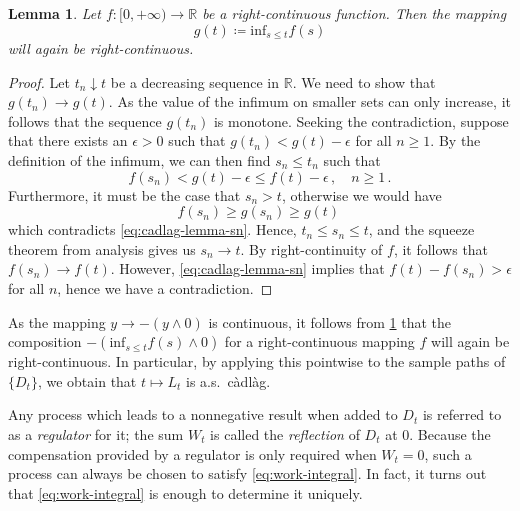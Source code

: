 \documentclass[titlepage]{article}
\theoremstyle{plain}
\newtheorem{lemma}{Lemma}[section]
\theoremstyle{definition}
\begin{document}
\begin{lemma} \label{lemma:running-inf-rc}
  Let $f: [0, +\infty) \rightarrow \mathbb{R}$ be a right-continuous function. Then the mapping
  \begin{equation}
    g(t) \coloneqq \mathrm{inf}_{s \leq t} f(s)
  \end{equation}
  will again be right-continuous.
\end{lemma}
\begin{proof}
  Let $t_n \downarrow t$ be a decreasing sequence in $\mathbb{R}$. We need to show that $g(t_n) \to g(t)$. As the value of the infimum on smaller sets can only increase, it follows that the sequence $g(t_n)$ is monotone. Seeking the contradiction, suppose that there exists an $\epsilon > 0$ such that $g(t_n) < g(t) - \epsilon$ for all $n \geq 1$. By the definition of the infimum, we can then find $s_n \leq t_n$ such that
  \begin{equation} \label{eq:cadlag-lemma-sn}
    f(s_n) < g(t) - \epsilon \leq f(t) - \epsilon \,, \quad n \geq 1 \,.
  \end{equation}
  Furthermore, it must be the case that $s_n > t$, otherwise we would have
  \begin{equation}
    f(s_n) \geq g(s_n) \geq g(t) \,
  \end{equation}
  which contradicts \cref{eq:cadlag-lemma-sn}. Hence, $t_n \leq s_n \leq t$, and the squeeze theorem from analysis gives us $s_n \to t$. By right-continuity of $f$, it follows that $f(s_n) \to f(t)$. However, \cref{eq:cadlag-lemma-sn} implies that $f(t) - f(s_n) > \epsilon$ for all $n$, hence we have a contradiction.
\end{proof}

As the mapping $y \to -(y \wedge 0)$ is continuous, it follows from \cref{lemma:running-inf-rc} that the composition $-(\mathrm{inf}_{s \leq t} f(s) \wedge 0)$ for a right-continuous mapping $f$ will again be right-continuous. In particular, by applying this pointwise to the sample paths of $\{ D_t \}$, we obtain that $t \mapsto L_t$ is a.s.\ c\`adl\`ag.

Any process which leads to a nonnegative result when added to $D_t$ is referred to as a \emph{regulator} for it; the sum $W_t$ is called the \emph{reflection} of $D_t$ at $0$. Because the compensation provided by a regulator is only required when $W_t = 0$, such a process can always be chosen to satisfy \cref{eq:work-integral}. In fact, it turns out that \cref{eq:work-integral} is enough to determine it uniquely.
\end{document}
